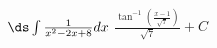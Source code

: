 {$\ds \int \frac{1}{x^2-2 x+8} dx $}
{$\frac{\tan ^{-1}\left(\frac{x-1}{\sqrt{7}}\right)}{\sqrt{7}}+C$}